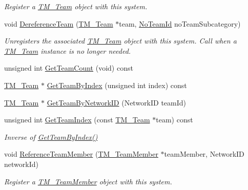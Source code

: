 \begin{DoxyCompactItemize}
\begin{DoxyCompactList}\small\item\em Register a \hyperlink{class_rak_net_1_1_t_m___team}{T\-M\-\_\-\-Team} object with this system. \end{DoxyCompactList}\item 
void \hyperlink{class_rak_net_1_1_t_m___world_a6b5e4a60afeebfb5999e59507ce81bbc}{Dereference\-Team} (\hyperlink{class_rak_net_1_1_t_m___team}{T\-M\-\_\-\-Team} $\ast$team, \hyperlink{group___t_e_a_m___m_a_n_a_g_e_r___g_r_o_u_p_gadd1e99b7724ceb0f6794f46de31a6b02}{No\-Team\-Id} no\-Team\-Subcategory)
\begin{DoxyCompactList}\small\item\em Unregisters the associated \hyperlink{class_rak_net_1_1_t_m___team}{T\-M\-\_\-\-Team} object with this system. Call when a \hyperlink{class_rak_net_1_1_t_m___team}{T\-M\-\_\-\-Team} instance is no longer needed. \end{DoxyCompactList}\item 
unsigned int \hyperlink{class_rak_net_1_1_t_m___world_ae86d1f83c9cebe13595baa6ff52dff2a}{Get\-Team\-Count} (void) const 
\item 
\hyperlink{class_rak_net_1_1_t_m___team}{T\-M\-\_\-\-Team} $\ast$ \hyperlink{class_rak_net_1_1_t_m___world_a8c43678d874b42f86499e77a88aa884c}{Get\-Team\-By\-Index} (unsigned int index) const 
\item 
\hyperlink{class_rak_net_1_1_t_m___team}{T\-M\-\_\-\-Team} $\ast$ \hyperlink{class_rak_net_1_1_t_m___world_a53c289dec148fba3411ad9caf194b755}{Get\-Team\-By\-Network\-I\-D} (Network\-I\-D team\-Id)
\item 
unsigned int \hyperlink{class_rak_net_1_1_t_m___world_a9b5f501e063bcfa0fa132187a809deab}{Get\-Team\-Index} (const \hyperlink{class_rak_net_1_1_t_m___team}{T\-M\-\_\-\-Team} $\ast$team) const 
\begin{DoxyCompactList}\small\item\em Inverse of \hyperlink{class_rak_net_1_1_t_m___world_a8c43678d874b42f86499e77a88aa884c}{Get\-Team\-By\-Index()} \end{DoxyCompactList}\item 
void \hyperlink{class_rak_net_1_1_t_m___world_a13c60cbb4d1894aece9e1b1b9887601f}{Reference\-Team\-Member} (\hyperlink{class_rak_net_1_1_t_m___team_member}{T\-M\-\_\-\-Team\-Member} $\ast$team\-Member, Network\-I\-D network\-Id)
\begin{DoxyCompactList}\small\item\em Register a \hyperlink{class_rak_net_1_1_t_m___team_member}{T\-M\-\_\-\-Team\-Member} object with this system. \end{DoxyCompactList}\item 

\end{DoxyCompactItemize}
